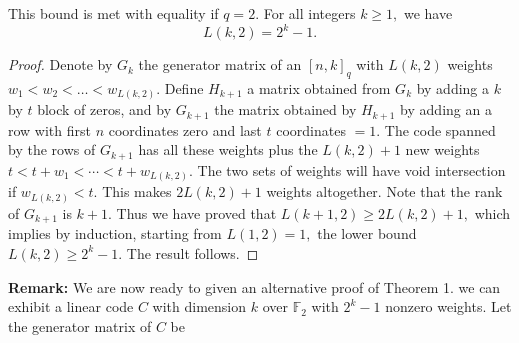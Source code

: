 \documentclass[12pt]{article}
\newcommand{\F}{\mathbb{F}}
\theoremstyle{definition}
\begin{document}
This bound is met with equality if $q=2.$
{\theorem \label{tight} For all integers $k\ge 1,$ we have
$$L(k,2)= {2^k-1}.$$}\vspace{-1.0cm}
\begin{proof}
Denote by $G_k$ the generator matrix of an $[n,k]_q$ with $L(k,2)$ weights $w_1<w_2<\dots<w_{L(k,2)}.$
Define $H_{k+1}$ a matrix obtained from $G_k$ by adding a $k$ by $t$ block of zeros, and by  $G_{k+1}$ the matrix obtained by $H_{k+1}$ by adding an
a row with first $n$ coordinates zero and last $t$ coordinates $=1.$
The code spanned by the rows of $G_{k+1}$ has all these weights plus the $ L(k,2)+1$ new weights $t<t+w_1<\cdots<t+w_{L(k,2)}.$ The two sets of weights will have void intersection if
$w_{L(k,2)}<t.$  This makes $2L(k,2)+1$ weights altogether. Note that the rank of $G_{k+1}$ is $k+1.$
Thus we have proved that  $L(k+1,2)\ge 2L(k,2)+1,$ which implies by induction, starting from $L(1,2)=1,$ the lower bound $L(k,2)\ge{2^k-1}.$ The result follows.\end{proof}
{\bf Remark:} We are now ready to given an alternative proof of Theorem 1. we can exhibit a linear code $C$ with dimension $k$ over $\F_2$ with $2^k-1$ nonzero weights. Let the generator matrix of $C$ be
\end{document}
